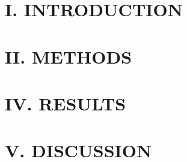 \begin{multicols}{2}
	
	
		
%	
	
	\section*{I. INTRODUCTION}%
	
	
	
	
	
	\section*{II. METHODS}%


	
	
	
	
	
	
	
	
	\section*{IV. RESULTS}%
	
	
	\section*{V. DISCUSSION}%
	

\end{multicols}

